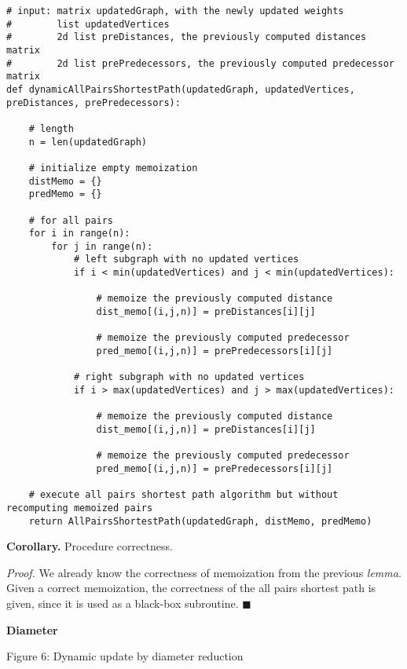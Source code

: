 \begin{verbatim}
# input: matrix updatedGraph, with the newly updated weights
#        list updatedVertices
#        2d list preDistances, the previously computed distances matrix
#        2d list prePredecessors, the previously computed predecessor matrix
def dynamicAllPairsShortestPath(updatedGraph, updatedVertices, preDistances, prePredecessors):
    
    # length
    n = len(updatedGraph)
    
    # initialize empty memoization
    distMemo = {}
    predMemo = {}
    
    # for all pairs
    for i in range(n):
        for j in range(n):
            # left subgraph with no updated vertices
            if i < min(updatedVertices) and j < min(updatedVertices):
            
                # memoize the previously computed distance
                dist_memo[(i,j,n)] = preDistances[i][j]
                
                # memoize the previously computed predecessor
                pred_memo[(i,j,n)] = prePredecessors[i][j]
            
            # right subgraph with no updated vertices
            if i > max(updatedVertices) and j > max(updatedVertices):
            
                # memoize the previously computed distance
                dist_memo[(i,j,n)] = preDistances[i][j]
                
                # memoize the previously computed predecessor
                pred_memo[(i,j,n)] = prePredecessors[i][j]
    
    # execute all pairs shortest path algorithm but without recomputing memoized pairs
    return AllPairsShortestPath(updatedGraph, distMemo, predMemo)
\end{verbatim}

\textbf{Corollary.} Procedure correctness.

\textit{Proof.} We already know the correctness of memoization from the previous \textit{lemma}. Given a correct memoization, the correctness of the all pairs shortest path is given, since it is used as a black-box subroutine. $\blacksquare$


\textbf{Diameter}

\begin{center}
    
    Figure 6: Dynamic update by diameter reduction
\end{center}

